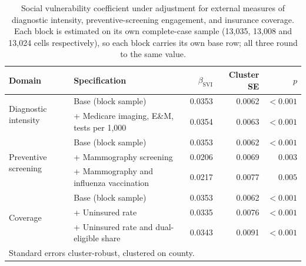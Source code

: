 \documentclass[11pt]{article}
\begin{document}
\begin{table}[htbp]
\centering
\caption{Social vulnerability coefficient under adjustment for external
measures of diagnostic intensity, preventive-screening engagement, and
insurance coverage. Each block is estimated on its own complete-case sample
(13,035, 13,008 and 13,024 cells respectively), so each block carries its own
base row; all three round to the same value.}
\label{tab:external}
\begin{tabular}{llrrr}
\toprule
Domain & Specification & $\beta_{\mathrm{SVI}}$ & Cluster SE & $p$ \\
\midrule
\multirow{2}{*}{Diagnostic intensity}
 & Base (block sample)                & 0.0353 & 0.0062 & $<0.001$ \\
 & + Medicare imaging, E\&M, tests per 1,000 & 0.0354 & 0.0063 & $<0.001$ \\
\midrule
\multirow{3}{*}{Preventive screening}
 & Base (block sample)                & 0.0353 & 0.0062 & $<0.001$ \\
 & + Mammography screening            & 0.0206 & 0.0069 & $0.003$ \\
 & + Mammography and influenza vaccination & 0.0217 & 0.0077 & $0.005$ \\
\midrule
\multirow{3}{*}{Coverage}
 & Base (block sample)                & 0.0353 & 0.0062 & $<0.001$ \\
 & + Uninsured rate                   & 0.0335 & 0.0076 & $<0.001$ \\
 & + Uninsured rate and dual-eligible share & 0.0343 & 0.0091 & $<0.001$ \\
\midrule
\multicolumn{5}{l}{\footnotesize Standard errors cluster-robust, clustered on county.}\\
\bottomrule
\end{tabular}
\end{table}
\end{document}

